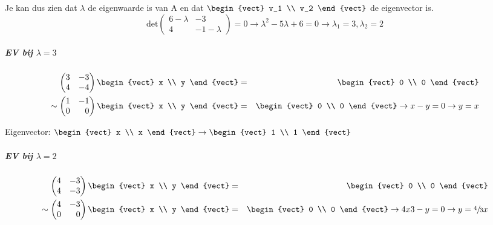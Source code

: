 Je kan dus zien dat $\lambda$ de eigenwaarde is van A en dat $\begin{vect} v_1 \\ v_2 \end{vect}$ de eigenvector is.
\[ \mbox{det} \begin{pmatrix} 6 - \lambda & -3 \\ 4 & -1- \lambda \end{pmatrix} = 0 \to \lambda^2 - 5\lambda + 6 = 0 \to \lambda_1 = 3, \lambda_2 = 2 \]

\subparagraph{EV bij $\lambda=3$}
\begin{eqnarray*}
	\begin{pmatrix*}[r] 3 & -3 \\ 4 & -4 \end{pmatrix*} \begin{vect} x \\ y \end{vect} &=& \begin{vect} 0 \\ 0 \end{vect} \\
	\sim \begin{pmatrix*}[r] 1 & -1 \\ 0 & 0 \end{pmatrix*} \begin{vect} x \\ y \end{vect} &=& \begin{vect} 0 \\ 0 \end{vect} \to x-y = 0 \to y = x
\end{eqnarray*}

Eigenvector: $\begin{vect} x \\ x \end{vect} \to \begin{vect} 1 \\ 1 \end{vect}$

\subparagraph{EV bij $\lambda=2$}
\begin{eqnarray*}
	\begin{pmatrix*}[r] 4 & -3 \\ 4 & -3 \end{pmatrix*} \begin{vect} x \\ y \end{vect} &=& \begin{vect} 0 \\ 0 \end{vect} \\
	\sim \begin{pmatrix*}[r] 4 & -3 \\ 0 & 0 \end{pmatrix*} \begin{vect} x \\ y \end{vect} &=& \begin{vect} 0 \\ 0 \end{vect} \to 4x3-y = 0 \to y = \sfrac{4}{3}x
\end{eqnarray*}

